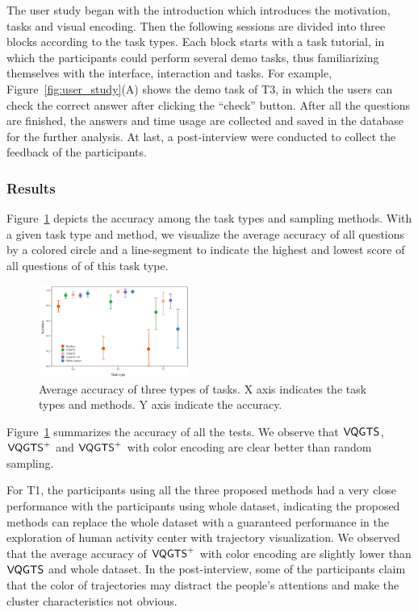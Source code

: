 The user study began with the introduction which introduces the motivation, tasks and visual encoding. Then the following sessions are divided into three blocks according to the task types. Each block starts with a task tutorial, in which the participants could perform several demo tasks, thus familiarizing themselves with the interface, interaction and tasks. For example, Figure~\ref{fig:user_study}(A) shows the demo task of T3, in which the users can check the correct answer after clicking the ``check'' button. After all the questions are finished, the answers and time usage are collected and saved in the database for the further analysis. At last, a post-interview were conducted to collect the feedback of the participants.  

\subsubsection{Results}
Figure~\ref{fig:accuracy} depicts the accuracy among the task types and sampling methods. With a given task type and method, we visualize the average accuracy of all questions by a colored circle and a line-segment to indicate the highest and lowest score of all questions of of this task type. 

\begin{figure}[t]
	\centering
	\includegraphics[width=0.44\textwidth]{pictures/user_study/accuracy.pdf}
	\vspace{-3mm}
	\caption{Average accuracy of three types of tasks. X axis indicates the task types and methods. Y axis indicate the accuracy.}
	\vspace{-5mm}
	\label{fig:accuracy}
\end{figure}

Figure~\ref{fig:accuracy} summarizes the accuracy of all the tests. 
We  observe that $\mathsf{VQGTS}$, $\mathsf{VQGTS}^{+}$ and $\mathsf{VQGTS}^{+}$ with color encoding are clear better than random sampling. 

For T1, the participants using all the three proposed methods had a very close performance with the participants using whole dataset, indicating the proposed methods can replace the whole dataset with a guaranteed performance in the exploration of human activity center with trajectory visualization. We observed that the average accuracy of $\mathsf{VQGTS}^{+}$ with color encoding are slightly lower than $\mathsf{VQGTS}$ and whole dataset. In the post-interview, some of the participants claim that the color of trajectories may distract the people's attentions and make the cluster characteristics not obvious.


